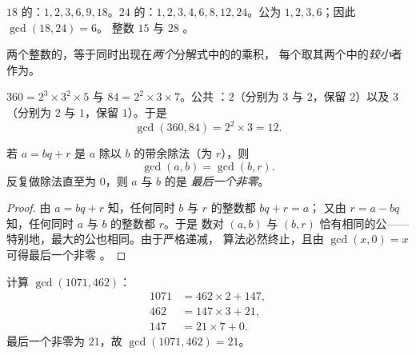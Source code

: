 \begin{example}
$18$ 的：$1, 2, 3, 6, 9, 18$。$24$ 的：$1, 2, 3, 4, 6,
8, 12, 24$。公为 $1, 2, 3, 6$；因此 $\gcd(18, 24) = 6$。
整数 $15$ 与 $28$ 。
\end{example}

\begin{proposition}[由质因数分解求最大公因数]\label{prop:g9:arith:gcdfact}
两个整数的，等于同时出现在\emph{两个}分解式中的的乘积，
每个取其两个中的\emph{较小}者
作为。
\end{proposition}
\admitted

\begin{example}\label{ex:g9:arith:gcdfact}
$360 = 2^3 \times 3^2 \times 5$ 与 $84 = 2^2 \times 3 \times 7$。公共
：$2$（分别为 $3$ 与 $2$，保留 $2$）以及 $3$（分别为 $2$ 与
$1$，保留 $1$）。于是
\[
\gcd(360, 84) = 2^2 \times 3 = 12 .
\]
\end{example}

\begin{theorem}[欧几里得算法]\label{thm:g9:arith:euclidalgo}
若 $a = bq + r$ 是 $a$ 除以 $b$ 的带余除法（为 $r$），则
\[
\gcd(a, b) = \gcd(b, r).
\]
反复做除法直至为 $0$，则 $a$ 与 $b$ 的是
\emph{最后一个非零}。
\end{theorem}

\begin{proof}
由 $a = bq + r$ 知，任何同时 $b$ 与 $r$ 的整数都 $bq + r = a$；
又由 $r = a - bq$ 知，任何同时 $a$ 与 $b$ 的整数都 $r$。于是
数对 $(a, b)$ 与 $(b, r)$ 恰有相同的公——
特别地，最大的公也相同。由于严格递减，
算法必然终止，且由 $\gcd(x, 0) = x$ 可得最后一个非零
。
\end{proof}

\begin{example}\label{ex:g9:arith:euclidalgo}
计算 $\gcd(1071, 462)$：
\begin{align*}
1071 &= 462 \times 2 + 147, \\
462 &= 147 \times 3 + 21, \\
147 &= 21 \times 7 + 0 .
\end{align*}
最后一个非零为 $21$，故 $\gcd(1071, 462) = 21$。
\end{example}

